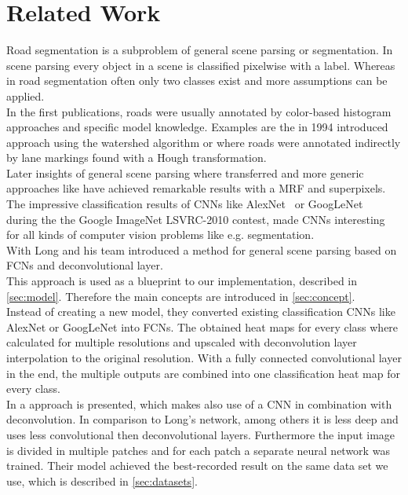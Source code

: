 
\section{Related Work}\label{sec:related-work}
Road segmentation is a subproblem of general scene parsing or segmentation. In
scene parsing every object in a scene is classified pixelwise with a label.
Whereas in road segmentation often only two classes exist and more assumptions
can be applied.\\
In the first publications, roads were usually annotated by color-based
histogram approaches and specific model knowledge. Examples are the in 1994
introduced approach \cite{Beucher1990} using the watershed algorithm or
\cite{aly2008real} where roads were annotated indirectly by lane markings found
with a Hough transformation.\\
Later insights of general scene parsing where transferred and more generic
approaches like \cite{6182716} have achieved remarkable results with a
\gls{MRF} and superpixels.\\ The impressive classification results of
\glspl{CNN} like AlexNet~\cite{krizhevsky2012imagenet} or
GoogLeNet~\cite{SzegedyLJSRAEVR14} during the the Google ImageNet LSVRC-2010
contest, made \glspl{CNN} interesting for all kinds of computer vision problems
like e.g. segmentation.\\
With \cite{long2014fully} Long and his team introduced a method for general
scene parsing based on \glspl{FCN} and deconvolutional layer.\\
This approach is used as a blueprint to our implementation, described in
\cref{sec:model}. Therefore the main concepts are introduced in
\cref{sec:concept}.\\
Instead of creating a new model, they converted existing classification
\glspl{CNN} like AlexNet or GoogLeNet into \glspl{FCN}. The obtained heat maps for
every class where calculated for multiple resolutions and upscaled with
deconvolution layer interpolation to the original resolution. With a fully
connected convolutional layer in the end, the multiple outputs are combined
into one classification heat map for every class.\\

In \cite{mohan2014deep} a approach is presented, which makes also use of a
\gls{CNN} in combination with deconvolution. In comparison to Long's network,
among others it is less deep and uses less convolutional then deconvolutional
layers. Furthermore the input image is divided in multiple patches and for each
patch a separate neural network was trained. Their model achieved the
best-recorded result on the same data set we use, which is described in
\cref{sec:datasets}.

